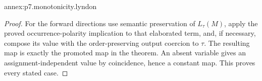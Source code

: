 \begin{annexitem}{annex:p7.monotonicity.lyndon}
\begin{proof}
For the forward directions use semantic preservation of \(L_\tau(M)\),
apply the proved occurrence-polarity implication to that elaborated term,
and, if necessary, compose its value with the order-preserving output
coercion to \(\tau\). The resulting map is exactly the promoted map
in the theorem. An absent variable gives an assignment-independent
value by coincidence, hence a constant map. This proves every stated case.
\end{proof}
\end{annexitem}
